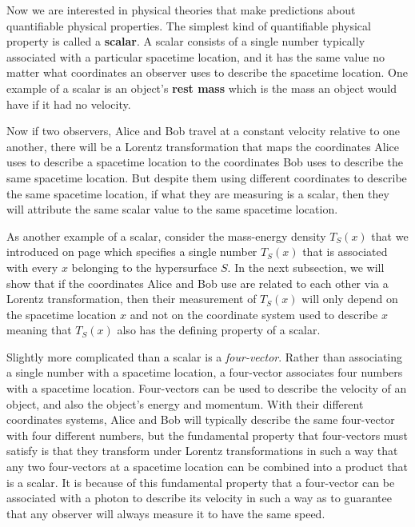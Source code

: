 Now we are interested in physical theories that make predictions about quantifiable physical properties. The simplest kind of quantifiable physical property is called a \textbf{scalar}.  A scalar consists of a single number typically associated with a particular spacetime location, and it has the same value no matter what coordinates an observer uses to describe the spacetime location. One example of a scalar is an object's \textbf{rest mass} which is the mass an object would have if it had no velocity. 

Now if two observers, Alice and Bob travel at a constant velocity relative to one another, there will be a Lorentz transformation that maps the coordinates Alice uses to describe a spacetime location to the coordinates  Bob uses to describe the same spacetime location.  But despite them using different coordinates to describe the same spacetime location, if what they are measuring is a scalar, then they will attribute the same scalar value to the same spacetime location.

As another example of a scalar, consider the mass-energy density $T_S(x)$ that we introduced on page \pageref{massenergydensity} which specifies a single number $T_S(x)$ that is associated with every $x$ belonging to the hypersurface $S$. In the next subsection, we will show that if the coordinates Alice and Bob use are related to each other via a Lorentz transformation, then their measurement of $T_S(x)$ will only depend on the spacetime location $x$ and not on the coordinate system used to describe $x$ meaning that $T_S(x)$ also has the defining property of a scalar.

Slightly more complicated than a scalar is a \emph{four-vector}. Rather than associating a single number with a spacetime location, a four-vector associates four numbers with a spacetime location. Four-vectors can be used to describe the velocity of an object, and also the object's energy and momentum. With their different coordinates systems, Alice and Bob will typically describe the same four-vector with four different numbers, but the fundamental property that four-vectors must satisfy is that they transform under Lorentz transformations in such a way that any two four-vectors at a spacetime location can be combined into a product that is a scalar. It is because of this fundamental property that a four-vector can be associated with a photon to describe its velocity in such a way as to guarantee that any observer will always measure it to have the same speed.

